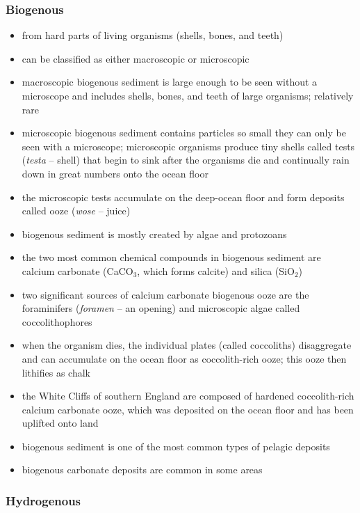\subsubsection{Biogenous}
\begin{itemize}
	\item from hard parts of living organisms (shells, bones, and teeth)
	\item can be classified as either macroscopic or microscopic
	\item macroscopic biogenous sediment is large enough to be seen
		without a microscope and includes shells, bones, and teeth of
		large organisms; relatively rare
	\item microscopic biogenous sediment contains particles so small they
		can only be seen with a microscope; microscopic organisms
		produce tiny shells called tests (\textit{testa} -- shell) that
		begin to sink after the organisms die and continually rain down
		in great numbers onto the ocean floor
	\item the microscopic tests accumulate on the deep-ocean floor and form
		deposits called ooze (\textit{wose} -- juice)
	\item biogenous sediment is mostly created by algae and protozoans
	\item the two most common chemical compounds in biogenous sediment are
		calcium carbonate (CaCO$_3$, which forms calcite) and silica
		(SiO$_2$)
	\item two significant sources of calcium carbonate biogenous ooze are
		the foraminifers (\textit{foramen} -- an opening) and
		microscopic algae called coccolithophores
	\item when the organism dies, the individual plates (called coccoliths)
		disaggregate and can accumulate on the ocean floor as
		coccolith-rich ooze; this ooze then lithifies as chalk
	\item the White Cliffs of southern England are composed of hardened
		coccolith-rich calcium carbonate ooze, which was deposited on
		the ocean floor and has been uplifted onto land
	\item biogenous sediment is one of the most common types of pelagic
		deposits
	\item biogenous carbonate deposits are common in some areas
\end{itemize}

\subsubsection{Hydrogenous}

